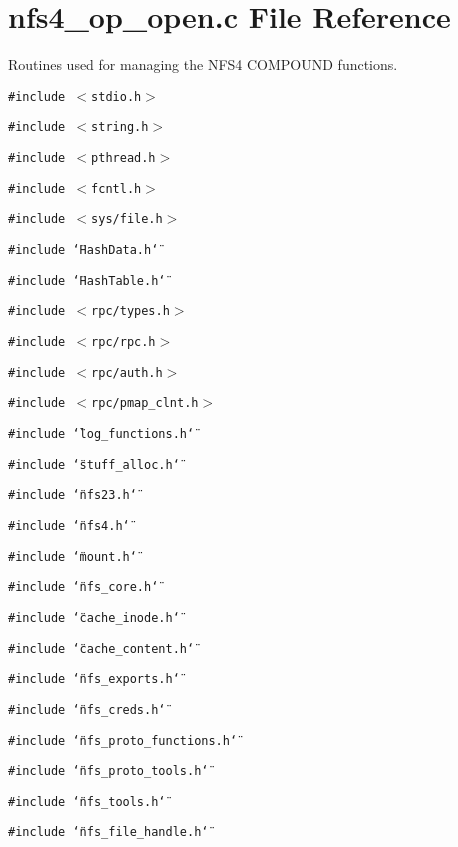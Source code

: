 \section{nfs4\_\-op\_\-open.c File Reference}
\label{nfs4__op__open_8c}
Routines used for managing the NFS4 COMPOUND functions. 

{\tt \#include $<$stdio.h$>$}\par
{\tt \#include $<$string.h$>$}\par
{\tt \#include $<$pthread.h$>$}\par
{\tt \#include $<$fcntl.h$>$}\par
{\tt \#include $<$sys/file.h$>$}\par
{\tt \#include \char`\"{}Hash\-Data.h\char`\"{}}\par
{\tt \#include \char`\"{}Hash\-Table.h\char`\"{}}\par
{\tt \#include $<$rpc/types.h$>$}\par
{\tt \#include $<$rpc/rpc.h$>$}\par
{\tt \#include $<$rpc/auth.h$>$}\par
{\tt \#include $<$rpc/pmap\_\-clnt.h$>$}\par
{\tt \#include \char`\"{}log\_\-functions.h\char`\"{}}\par
{\tt \#include \char`\"{}stuff\_\-alloc.h\char`\"{}}\par
{\tt \#include \char`\"{}nfs23.h\char`\"{}}\par
{\tt \#include \char`\"{}nfs4.h\char`\"{}}\par
{\tt \#include \char`\"{}mount.h\char`\"{}}\par
{\tt \#include \char`\"{}nfs\_\-core.h\char`\"{}}\par
{\tt \#include \char`\"{}cache\_\-inode.h\char`\"{}}\par
{\tt \#include \char`\"{}cache\_\-content.h\char`\"{}}\par
{\tt \#include \char`\"{}nfs\_\-exports.h\char`\"{}}\par
{\tt \#include \char`\"{}nfs\_\-creds.h\char`\"{}}\par
{\tt \#include \char`\"{}nfs\_\-proto\_\-functions.h\char`\"{}}\par
{\tt \#include \char`\"{}nfs\_\-proto\_\-tools.h\char`\"{}}\par
{\tt \#include \char`\"{}nfs\_\-tools.h\char`\"{}}\par
{\tt \#include \char`\"{}nfs\_\-file\_\-handle.h\char`\"{}}\par
